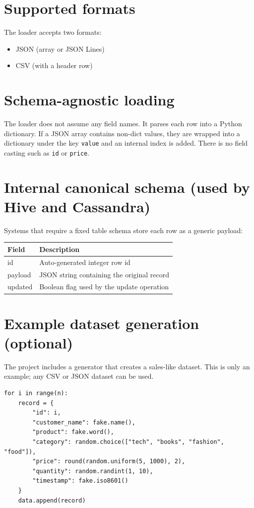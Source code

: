 \documentclass[12pt]{report}
\begin{document}
\section{Supported formats}
The loader accepts two formats:
\begin{itemize}
  \item JSON (array or JSON Lines)
  \item CSV (with a header row)
\end{itemize}

\section{Schema-agnostic loading}
The loader does not assume any field names. It parses each row into a Python dictionary. If a JSON
array contains non-dict values, they are wrapped into a dictionary under the key \texttt{value} and
an internal index is added. There is no field casting such as \texttt{id} or \texttt{price}.

\section{Internal canonical schema (used by Hive and Cassandra)}
Systems that require a fixed table schema store each row as a generic payload:
\begin{longtable}{ll}
\toprule
Field & Description \\
\midrule
id & Auto-generated integer row id \\
payload & JSON string containing the original record \\
updated & Boolean flag used by the update operation \\
\bottomrule
\end{longtable}

\section{Example dataset generation (optional)}
The project includes a generator that creates a sales-like dataset. This is only an example; any
CSV or JSON dataset can be used.

\begin{lstlisting}[caption={Simplified example dataset generator}]
for i in range(n):
    record = {
        "id": i,
        "customer_name": fake.name(),
        "product": fake.word(),
        "category": random.choice(["tech", "books", "fashion", "food"]),
        "price": round(random.uniform(5, 1000), 2),
        "quantity": random.randint(1, 10),
        "timestamp": fake.iso8601()
    }
    data.append(record)
\end{lstlisting}
\end{document}
